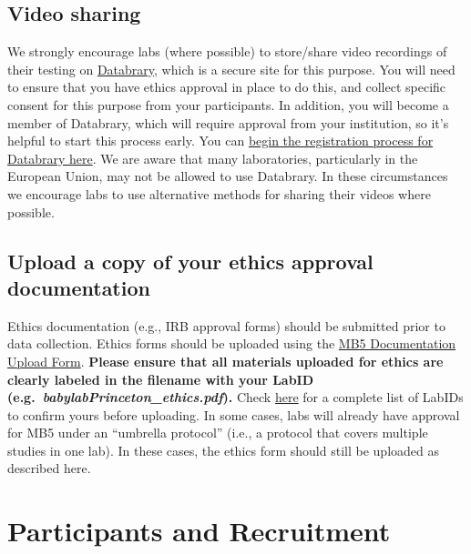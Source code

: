 \documentclass[
]{book}
\begin{document}
\hypertarget{video-sharing}{%
\subsection{Video sharing}\label{video-sharing}}

We strongly encourage labs (where possible) to store/share video recordings of their testing on \href{https://nyu.databrary.org/}{Databrary}, which is a secure site for this purpose. You will need to ensure that you have ethics approval in place to do this, and collect specific consent for this purpose from your participants. In addition, you will become a member of Databrary, which will require approval from your institution, so it's helpful to start this process early. You can \href{https://nyu.databrary.org/user/register?page=create}{begin the registration process for Databrary here}. We are aware that many laboratories, particularly in the European Union, may not be allowed to use Databrary. In these circumstances we encourage labs to use alternative methods for sharing their videos where possible.

\hypertarget{upload-a-copy-of-your-ethics-approval-documentation}{%
\subsection{Upload a copy of your ethics approval documentation}\label{upload-a-copy-of-your-ethics-approval-documentation}}

Ethics documentation (e.g., IRB approval forms) should be submitted prior to data collection. Ethics forms should be uploaded using the \href{https://docs.google.com/forms/d/e/1FAIpQLScTTmcQl1P1F4UWe95Jo7u5bken40AyAefXCYUJ9iYbnWaG8Q/viewform?usp=sf_link}{MB5 Documentation Upload Form}. \textbf{Please ensure that all materials uploaded for ethics are clearly labeled in the filename with your LabID (e.g.~\emph{babylabPrinceton\_ethics.pdf}).} Check \href{https://manybabies.org/labids/}{here} for a complete list of LabIDs to confirm yours before uploading. In some cases, labs will already have approval for MB5 under an ``umbrella protocol'' (i.e., a protocol that covers multiple studies in one lab). In these cases, the ethics form should still be uploaded as described here.

\hypertarget{participants-and-recruitment}{%
\section{Participants and Recruitment}\label{participants-and-recruitment}}
\end{document}
